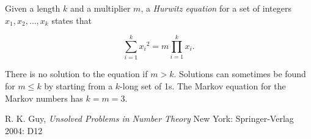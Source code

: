\documentclass[12pt]{article}
\begin{document}
Given a length $k$ and a multiplier $m$, a {\em Hurwitz equation} for a set of integers $x_1, x_2, \ldots , x_k$ states that

$$\sum_{i = 1}^k {x_i}^2 = m\prod_{i = 1}^k x_i.$$

There is no solution to the equation if $m > k$. Solutions can sometimes be found for $m \leq k$ by starting from a $k$-long set of 1s. The Markov equation for the Markov numbers has $k = m = 3$.

\begin{thebibliography}{2}
 R. K. Guy, {\it Unsolved Problems in Number Theory} New York: Springer-Verlag 2004: D12
\end{thebibliography}

\end{document}
